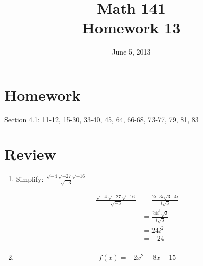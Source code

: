 \documentclass{exam}
\date{June 5, 2013}
\author{}
\title{Math 141 \\ Homework 13}
\begin{document}
  \maketitle

  \section{Homework}

  Section 4.1: 11-12, 15-30, 33-40, 45, 64, 66-68, 73-77, 79, 81, 83

  \section{Review}

  \begin{enumerate}
    \item Simplify: $\frac{\sqrt{-4}\sqrt{-27}\sqrt{-16}}{\sqrt{-3}}$
      \begin{solution}
        \begin{align*}
          \frac{\sqrt{-4}\sqrt{-27}\sqrt{-16}}{\sqrt{-3}} &= \frac{2i \cdot 3i \sqrt{3} \cdot 4i}{i \sqrt{3}} \\
          &= \frac{24i^3 \sqrt{3}}{i \sqrt{3}} \\
          &= 24 i^2 \\
          &= -24 \\
        \end{align*}
      \end{solution}

    \item
      \[
        \boxed{f(x) = - 2x^2 - 8x - 15}
      \]


  \end{enumerate}
\end{document}

